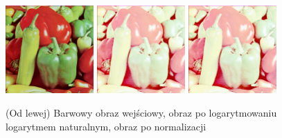 \documentclass[final,a4paper,openany,12pt]{mwbk}
\begin{document}
\hfill
\\\\
\indent

\begin{figure}[H]
	\begin{center}
		\includegraphics[width=0.3\textwidth]{1/1Color_Log_Original}
		\includegraphics[width=0.3\textwidth]{1/1Color_Log_Result}
		\includegraphics[width=0.3\textwidth]{1/1Color_Log_Result_Norm}
	\end{center}
	\caption{(Od lewej) Barwowy obraz wejściowy, obraz po logarytmowaniu logarytmem naturalnym, obraz po normalizacji }
\end{figure}
\end{document}
